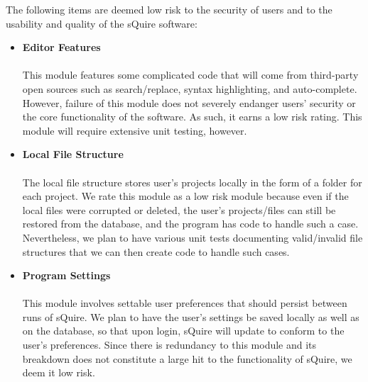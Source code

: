 \documentclass[14pt, a4paper]{article}
\begin{document}
The following items are deemed low risk to the security of users and to the usability and quality of the sQuire software:

\begin{itemize}
	\item \textbf{Editor Features} \\ \\
	This module features some complicated code that will come from third-party open sources such as search/replace, syntax highlighting, and auto-complete. However, failure of this module does not severely endanger users' security or the core functionality of the software. As such, it earns a low risk rating. This module will require extensive unit testing, however.
	\item \textbf{Local File Structure} \\ \\
	The local file structure stores user's projects locally in the form of a folder for each project. We rate this module as a low risk module because even if the local files were corrupted or deleted, the user's projects/files can still be restored from the database, and the program has code to handle such a case. Nevertheless, we plan to have various unit tests documenting valid/invalid file structures that we can then create code to handle such cases.
	\item \textbf{Program Settings} \\ \\
	This module involves settable user preferences that should persist between runs of sQuire. We plan to have the user's settings be saved locally as well as on the database, so that upon login, sQuire will update to conform to the user's preferences. Since there is redundancy to this module and its breakdown does not constitute a large hit to the functionality of sQuire, we deem it low risk.
\end{itemize}
\end{document}
